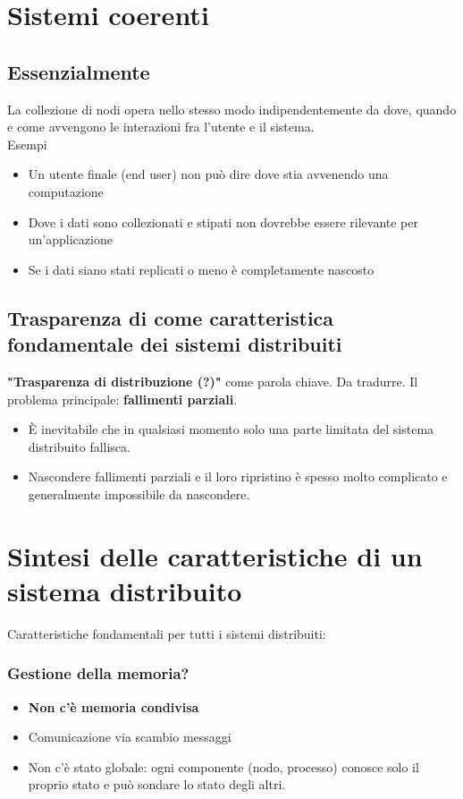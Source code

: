 \section{Sistemi coerenti}
\subsection{Essenzialmente}
La collezione di nodi opera nello stesso modo indipendentemente da dove, quando e come avvengono le interazioni fra l'utente e il sistema.
\\Esempi
\begin{itemize}
    \item Un utente finale (end user) non può dire dove stia avvenendo una computazione
    \item Dove i dati sono collezionati e stipati non dovrebbe essere rilevante per un'applicazione
    \item Se i dati siano stati replicati o meno è completamente nascosto
\end{itemize}

\subsection{Trasparenza di come caratteristica fondamentale dei sistemi distribuiti}
\textbf{"Trasparenza di distribuzione (?)"} come parola chiave. Da tradurre.
Il problema principale: \textbf{fallimenti parziali}.
\begin{itemize}
    \item \`E inevitabile che in qualsiasi momento solo una parte limitata del sistema distribuito fallisca.
    \item Nascondere fallimenti parziali e il loro ripristino è spesso molto complicato e generalmente impossibile da nascondere.
\end{itemize}

\section{Sintesi delle caratteristiche di un sistema distribuito}
Caratteristiche fondamentali per tutti i sistemi distribuiti:
\subsubsection{Gestione della memoria?}
\begin{itemize}
    \item \textbf{Non c'è memoria condivisa}
    \item Comunicazione via scambio messaggi
    \item Non c'è stato globale: ogni componente (nodo, processo) conosce solo il proprio stato e può sondare lo stato degli altri.
\end{itemize}

